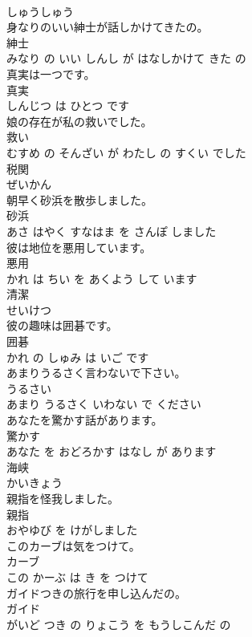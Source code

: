 \documentclass[8pt]{extreport}
\begin{document}
\begin{CJK}{UTF8}{min}
\\	しゅうしゅう			
\\	身なりのいい紳士が話しかけてきたの。	
\\	紳士 
\\	みなり の いい しんし が はなしかけて きた の			
\\	真実は一つです。	
\\	真実 
\\	しんじつ は ひとつ です			
\\	娘の存在が私の救いでした。	
\\	救い 
\\	むすめ の そんざい が わたし の すくい でした			
\\	税関	
\\	ぜいかん			
\\	朝早く砂浜を散歩しました。	
\\	砂浜 
\\	あさ はやく すなはま を さんぽ しました			
\\	彼は地位を悪用しています。	
\\	悪用 
\\	かれ は ちい を あくよう して います			
\\	清潔	
\\	せいけつ			
\\	彼の趣味は囲碁です。	
\\	囲碁 
\\	かれ の しゅみ は いご です			
\\	あまりうるさく言わないで下さい。	
\\	うるさい 
\\	あまり うるさく いわない で ください			
\\	あなたを驚かす話があります。	
\\	驚かす 
\\	あなた を おどろかす はなし が あります			
\\	海峡	
\\	かいきょう			
\\	親指を怪我しました。	
\\	親指 
\\	おやゆび を けがしました			
\\	このカーブは気をつけて。	
\\	カーブ 
\\	この かーぶ は き を つけて			
\\	ガイドつきの旅行を申し込んだの。	
\\	ガイド 
\\	がいど つき の りょこう を もうしこんだ の			

\end{CJK}
\end{document}
